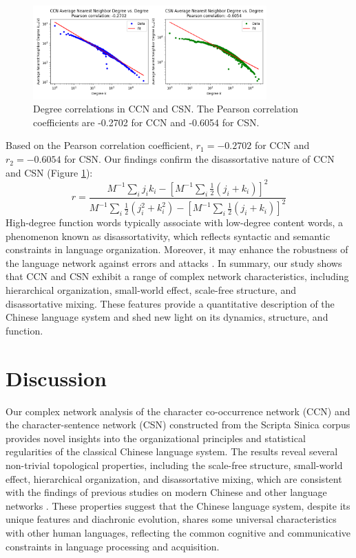 \documentclass[11pt]{article}
\begin{document}
\begin{figure}[htbp]
    \centering
    \includegraphics[width=0.8\textwidth]{../analysis/knn/knn.png}
    \caption{Degree correlations in CCN and CSN. The Pearson correlation coefficients are -0.2702 for CCN and -0.6054 for CSN.}
    \label{fig:degree_correlation}
    \end{figure}
    Based on the Pearson correlation coefficient, $r_1=-0.2702$ for CCN and $r_2=-0.6054$ for CSN. Our findings confirm the disassortative nature of CCN and CSN (Figure \ref{fig:degree_correlation}):
    \begin{equation}
    r = \frac{M^{-1}\sum_{i}j_ik_i-[M^{-1}\sum_{i}\frac{1}{2}(j_i+k_i)]^2}{M^{-1}\sum_{i}\frac{1}{2}(j_i^2+k_i^2)-[M^{-1}\sum_{i}\frac{1}{2}(j_i+k_i)]^2}
    \end{equation}
    High-degree function words typically associate with low-degree content words, a phenomenon known as disassortativity, which reflects syntactic and semantic constraints in language organization. Moreover, it may enhance the robustness of the language network against errors and attacks \cite{newman2002assortative}.
    In summary, our study shows that CCN and CSN exhibit a range of complex network characteristics, including hierarchical organization, small-world effect, scale-free structure, and disassortative mixing. These features provide a quantitative description of the Chinese language system and shed new light on its dynamics, structure, and function. 
\section{Discussion}
Our complex network analysis of the character co-occurrence network (CCN) and the character-sentence network (CSN) constructed from the Scripta Sinica corpus provides novel insights into the organizational principles and statistical regularities of the classical Chinese language system. The results reveal several non-trivial topological properties, including the scale-free structure, small-world effect, hierarchical organization, and disassortative mixing, which are consistent with the findings of previous studies on modern Chinese and other language networks \cite{sole2010language}. These properties suggest that the Chinese language system, despite its unique features and diachronic evolution, shares some universal characteristics with other human languages, reflecting the common cognitive and communicative constraints in language processing and acquisition.
\end{document}
